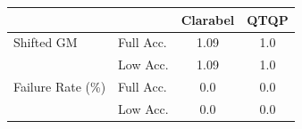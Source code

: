 \begin{tabular}{|l|l|c|c|}
  \hline
   &  & \textbf{Clarabel} & \textbf{QTQP} \\
  \hline
  Shifted GM & Full Acc. & 1.09 & 1.0 \\
   & Low Acc. & 1.09 & 1.0 \\
  Failure Rate (\%) & Full Acc. & 0.0 & 0.0 \\
   & Low Acc. & 0.0 & 0.0 \\
  \hline
\end{tabular}
